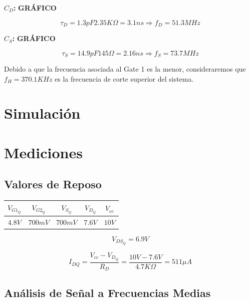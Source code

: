 \documentclass[a4paper, 10pt, spanish]{article}
\begin{document}
\textbf{$C_{D}$:}
\textbf{GRÁFICO}

\begin{equation}
  \tau_{D} = 1.3pF 2.35K\Omega = 3.1ns \Rightarrow f_{D} = 51.3 MHz
\end{equation}

\textbf{$C_{S}$:}
\textbf{GRÁFICO}

\begin{equation}
  \tau_{S} = 14.9 pF 145\Omega = 2.16ns \Rightarrow f_{S} = 73.7 MHz
\end{equation}

Debido a que la frecuencia asociada al Gate 1 es la menor, consideraremos que $f_H=370.1KHz$ es la frecuencia de corte superior del sistema.

\section{Simulación}

\section{Mediciones}

\subsection{Valores de Reposo}

\begin{center}
  \begin{tabular}{|c|c|c|c|c|}
    \hline
    $V_{G1_Q}$ & $V_{G2_Q}$ & $V_{S_Q}$ & $V_{D_Q}$ & $V_{cc}$ \\
    \hline
    $4.8V$ & $700mV$ & $700mV$ & $7.6V$ & $10V$ \\
    \hline
  \end{tabular}
  \label{tab:valores_reposo_med}
\end{center}

\begin{equation}
  V_{DS_Q} = 6.9V
\end{equation}

\begin{equation}
  I_{DQ} = \frac{V_{cc} - V_{D_Q}}{R_D} = \frac{10V - 7.6V}{4.7K\Omega} = 511 \mu A
\end{equation}

\subsection{Análisis de Señal a Frecuencias Medias}
\end{document}
